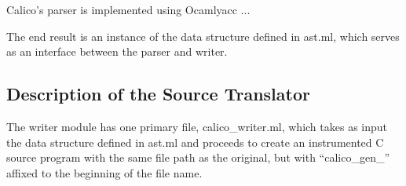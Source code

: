 \documentclass[notitlepage]{article}
\begin{document}
Calico's parser is implemented using Ocamlyacc ... %

The end result is an instance of the data structure defined in ast.ml, which serves as an interface between the parser and writer.





\subsection{Description of the Source Translator}

The writer module has one primary file, calico\_writer.ml, which takes as input the data structure defined in ast.ml and proceeds to create an instrumented C source program with the same file path as the original, but with ``calico\_gen\_'' affixed to the beginning of the file name.
\end{document}
